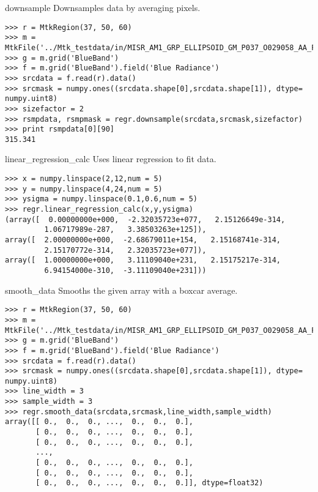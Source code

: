 \documentclass{howto}
\begin{document}
\begin{methoddesc}{downsample}{}
    Downsamples data by averaging pixels.

\begin{verbatim}
>>> r = MtkRegion(37, 50, 60)
>>> m = MtkFile('../Mtk_testdata/in/MISR_AM1_GRP_ELLIPSOID_GM_P037_O029058_AA_F03_0024.hdf')
>>> g = m.grid('BlueBand')
>>> f = m.grid('BlueBand').field('Blue Radiance')
>>> srcdata = f.read(r).data()
>>> srcmask = numpy.ones((srcdata.shape[0],srcdata.shape[1]), dtype= numpy.uint8)
>>> sizefactor = 2
>>> rsmpdata, rsmpmask = regr.downsample(srcdata,srcmask,sizefactor)
>>> print rsmpdata[0][90]
315.341
\end{verbatim}
\end{methoddesc}

\begin{methoddesc}{linear_regression_calc}{}
    Uses linear regression to fit data.

\begin{verbatim}
>>> x = numpy.linspace(2,12,num = 5)
>>> y = numpy.linspace(4,24,num = 5)
>>> ysigma = numpy.linspace(0.1,0.6,num = 5)
>>> regr.linear_regression_calc(x,y,ysigma)
(array([  0.00000000e+000,  -2.32035723e+077,   2.15126649e-314,
         1.06717989e-287,   3.38503263e+125]), 
array([  2.00000000e+000,  -2.68679011e+154,   2.15168741e-314,
         2.15170772e-314,   2.32035723e+077]), 
array([  1.00000000e+000,   3.11109040e+231,   2.15175217e-314,
         6.94154000e-310,  -3.11109040e+231]))
\end{verbatim}
\end{methoddesc}

\begin{methoddesc}{smooth_data}{}
    Smooths the given array with a boxcar average.

\begin{verbatim}
>>> r = MtkRegion(37, 50, 60)
>>> m = MtkFile('../Mtk_testdata/in/MISR_AM1_GRP_ELLIPSOID_GM_P037_O029058_AA_F03_0024.hdf')
>>> g = m.grid('BlueBand')
>>> f = m.grid('BlueBand').field('Blue Radiance')
>>> srcdata = f.read(r).data()
>>> srcmask = numpy.ones((srcdata.shape[0],srcdata.shape[1]), dtype= numpy.uint8)
>>> line_width = 3
>>> sample_width = 3
>>> regr.smooth_data(srcdata,srcmask,line_width,sample_width)
array([[ 0.,  0.,  0., ...,  0.,  0.,  0.],
       [ 0.,  0.,  0., ...,  0.,  0.,  0.],
       [ 0.,  0.,  0., ...,  0.,  0.,  0.],
       ...,
       [ 0.,  0.,  0., ...,  0.,  0.,  0.],
       [ 0.,  0.,  0., ...,  0.,  0.,  0.],
       [ 0.,  0.,  0., ...,  0.,  0.,  0.]], dtype=float32)
\end{verbatim}
\end{methoddesc} 
\end{document}
